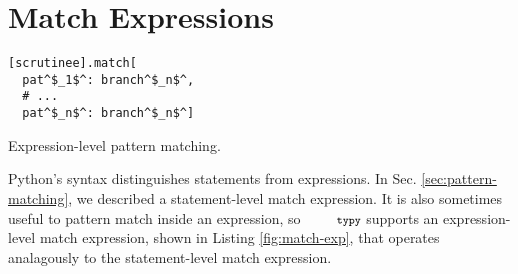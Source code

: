 \documentclass[10pt]{sigplanconf}
\newcommand{\typy}{\texttt{\footnotesize typy}}
\begin{document}
\section{Match Expressions}\label{appendix:match-expressions}
\begin{codelisting}[h!]
\vspace{-3px}
\begin{lstlisting}
[scrutinee].match[
  pat^$_1$^: branch^$_n$^, 
  # ...
  pat^$_n$^: branch^$_n$^]\end{lstlisting}
\caption{Expression-level pattern matching.}
\label{fig:match-exp}
\end{codelisting}

Python's syntax distinguishes statements from expressions. In Sec. \ref{sec:pattern-matching}, we described a statement-level match expression. It is also sometimes useful to pattern match inside an expression, so $\typy$ supports an expression-level match expression, shown in Listing \ref{fig:match-exp}, that operates analagously to the statement-level match expression. 

\begin{lstlisting}

\end{lstlisting}
\end{document}
